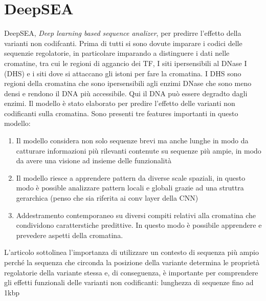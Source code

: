 \section{DeepSEA}
DeepSEA, \textit{Deep learning based sequence analizer}, per predirre l'effetto della varianti non codifcanti. Prima di tutti si sono dovute imparare i codici delle sequenzie regolatorie, in particolare imparando a distinguere i dati nelle cromatine, tra cui le regioni di aggancio dei \acs{TF}, I siti ipersensibili al DNase I (DHS) e i siti dove si attaccano gli istoni per fare la cromatina. I DHS sono regioni della cromatina che sono ipersensibili agli enzimi DNase che sono meno densi e rendono il DNA più accessibile. Qui il DNA può essere degradto dagli enzimi.
Il modello è stato elaborato per predire l'effetto delle varianti non codificanti sulla cromatina. Sono presenti tre features importanti in questo modello:
\begin{enumerate}
    \item Il modello considera non solo sequenze brevi ma anche lunghe in modo da catturare informazioni più rilevanti contenute su sequenze più ampie, in modo da avere una visione ad insieme delle funzionalità
    \item Il modello riesce a apprendere pattern da diverse scale spaziali, in questo modo è possible analizzare pattern locali e globali grazie ad una struttra gerarchica (penso che sia riferita ai conv layer della CNN)
    \item Addestramento contemporaneo su diversi compiti relativi alla cromatina che condividono caratterstiche predittive. In questo modo è possibile apprendere e prevedere aspetti della cromatina.
\end{enumerate}
% 
L'articolo sottolinea l'importanza di utilizzare un contesto di sequenza più ampio perché la sequenza che circonda la posizione della variante determina le proprietà regolatorie della variante stessa e, di conseguenza, è importante per comprendere gli effetti funzionali delle varianti non codificanti: lunghezza di sequenze fino ad 1kbp

